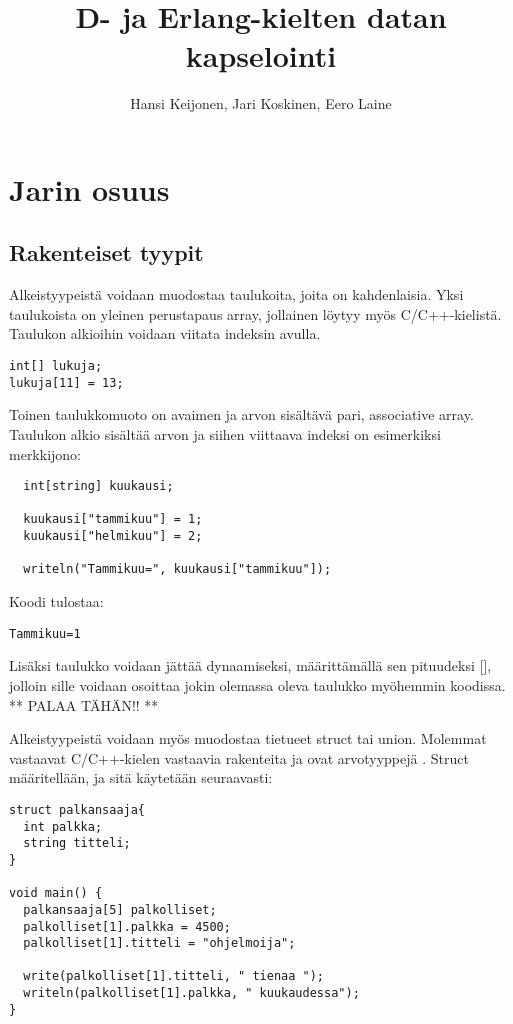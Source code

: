 \documentclass[11pt,oneside,a4paper]{article}
\title{D- ja Erlang-kielten datan kapselointi}
\author{Hansi Keijonen, Jari Koskinen, Eero Laine}
\begin{document}
\maketitle

\newpage

\section{Jarin osuus}
\subsection{Rakenteiset tyypit}
Alkeistyypeistä voidaan muodostaa taulukoita, joita on kahdenlaisia. Yksi taulukoista on yleinen perustapaus array, jollainen löytyy myös C/C++-kielistä. Taulukon alkioihin voidaan viitata indeksin avulla.
\begin{verbatim}
int[] lukuja;
lukuja[11] = 13;
\end{verbatim}

Toinen taulukkomuoto on avaimen ja arvon sisältävä pari, associative array. Taulukon alkio sisältää arvon ja siihen viittaava indeksi on esimerkiksi merkkijono: 
\begin{verbatim}
  int[string] kuukausi;
  
  kuukausi["tammikuu"] = 1;
  kuukausi["helmikuu"] = 2;
  
  writeln("Tammikuu=", kuukausi["tammikuu"]);
\end{verbatim}
Koodi tulostaa:
\begin{verbatim}
Tammikuu=1
\end{verbatim}

Lisäksi taulukko voidaan jättää dynaamiseksi, määrittämällä sen pituudeksi [], jolloin sille voidaan osoittaa jokin olemassa oleva taulukko myöhemmin koodissa. ** PALAA TÄHÄN!! **

Alkeistyypeistä voidaan myös muodostaa tietueet struct tai union. Molemmat vastaavat C/C++-kielen vastaavia rakenteita ja ovat arvotyyppejä \cite{DLA13}. Struct määritellään, ja sitä käytetään seuraavasti:

\begin{verbatim}
struct palkansaaja{
  int palkka;
  string titteli;
}

void main() {
  palkansaaja[5] palkolliset;
  palkolliset[1].palkka = 4500;
  palkolliset[1].titteli = "ohjelmoija";

  write(palkolliset[1].titteli, " tienaa ");
  writeln(palkolliset[1].palkka, " kuukaudessa");
}
\end{verbatim}
\end{document}
